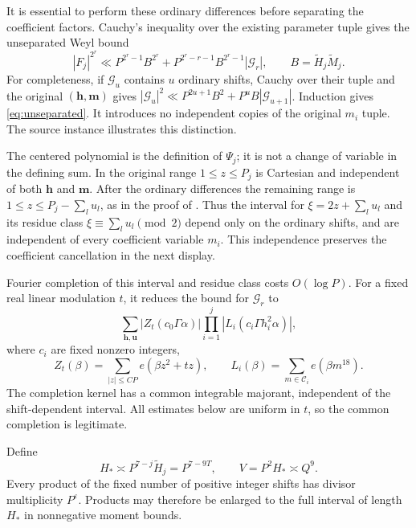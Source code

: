 \documentclass[11pt,letterpaper]{article}
\numberwithin{equation}{section}
\begin{document}
It is essential to perform these ordinary differences before separating
the coefficient factors.  Cauchy's inequality over the existing parameter
tuple gives the unseparated Weyl bound
\begin{equation}
 |F_j|^{2^r}\ll P^{2^r-1}B^{2^r}
       +P^{2^r-r-1}B^{2^r-1}|\mathcal G_r|,
 \qquad B=\widetilde H_j\widetilde M_j.
 \label{eq:unseparated}
\end{equation}
For completeness, if $\mathcal G_u$ contains $u$ ordinary shifts, Cauchy
over their tuple and the original $(\mathbf h,\mathbf m)$ gives
$|\mathcal G_u|^2\ll P^{2u+1}B^2+P^uB|\mathcal G_{u+1}|$.
Induction gives \eqref{eq:unseparated}.  It introduces no independent
copies of the original $m_i$ tuple.  The source instance
\cite[(12.17)]{VW95} illustrates this distinction.

The centered polynomial is the definition of $\Psi_j$; it is not a change
of variable in the defining sum.  In \cite[(2.1)]{VW00} the original range
$1\le z\le P_j$ is Cartesian and independent of both $\mathbf h$ and
$\mathbf m$.  After the ordinary differences the remaining range is
$1\le z\le P_j-\sum_lu_l$, as in the proof of \cite[Lemma 3.1]{VW00}.
Thus the interval for $\xi=2z+\sum_lu_l$ and its residue class
$\xi\equiv\sum_lu_l\pmod2$ depend only on the ordinary shifts, and are
independent of every coefficient variable $m_i$.  This independence
preserves the coefficient cancellation in the next display.

Fourier completion of this interval and residue class costs $O(\log P)$.
For a fixed real linear modulation $t$, it reduces the bound for
$\mathcal G_r$ to
\begin{equation}
 \sum_{\mathbf h,\mathbf u}
      |Z_t(c_0\Gamma\alpha)|
      \prod_{i=1}^j|L_i(c_i\Gamma h_i^2\alpha)|,
 \label{eq:completed-product}
\end{equation}
where $c_i$ are fixed nonzero integers,
\[
 Z_t(\beta)=\sum_{|z|\le CP}e(\beta z^2+tz),\qquad
 L_i(\beta)=\sum_{m\in\mathcal C_i}e(\beta m^{18}).
\]
The completion kernel has a common integrable majorant, independent of
the shift-dependent interval.  All estimates below are uniform in $t$,
so the common completion is legitimate.

Define
\[
 H_*\asymp P^{7-j}\widetilde H_j=P^{7-9T},\qquad
 V=P^2H_*\asymp Q^9.
\]
Every product of the fixed number of positive integer shifts has divisor
multiplicity $P^\varepsilon$.  Products may therefore be enlarged to the
full interval of length $H_*$ in nonnegative moment bounds.
\end{document}
